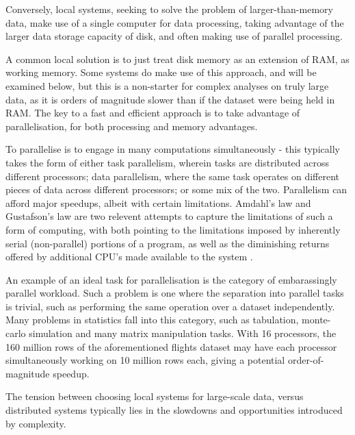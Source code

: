 Conversely, local systems, seeking to solve the problem of larger-than-memory data, make use of a single computer for data processing, taking advantage of the larger data storage capacity of disk, and often making use of parallel processing.

A common local solution is to just treat disk memory as an extension of RAM, as working memory.
Some systems do make use of this approach, and will be examined below, but this is a non-starter for complex analyses on truly large data, as it is orders of magnitude slower than if the dataset were being held in RAM\cite{alpern1994memhierarchy}.
The key to a fast and efficient approach is to take advantage of parallelisation, for both processing and memory advantages.

To parallelise is to engage in many computations simultaneously - this typically takes the form of either task parallelism, wherein tasks are distributed across different processors; data parallelism, where the same task operates on different pieces of data across different processors; or some mix of the two\cite{subhlok1993exploiting}.
Parallelism can afford major speedups, albeit with certain limitations.
Amdahl's law and Gustafson's law are two relevent attempts to capture the limitations of such a form of computing, with both pointing to the limitations imposed by inherently serial (non-parallel) portions of a program, as well as the diminishing returns offered by additional CPU's made available to the system \cite{amdahl1967law}\cite{gustafson1988law}.

An example of an ideal task for parallelisation is the category of embarassingly parallel workload.
Such a problem is one where the separation into parallel tasks is trivial, such as performing the same operation over a dataset independently\cite{foster1995parallel}.
Many problems in statistics fall into this category, such as tabulation, monte-carlo simulation and many matrix manipulation tasks.
With 16 processors, the 160 million rows of the aforementioned flights dataset may have each processor simultaneously working on 10 million rows each, giving a potential order-of-magnitude speedup.

The tension between choosing local systems for large-scale data, versus distributed systems typically lies in the slowdowns and opportunities introduced by complexity.

